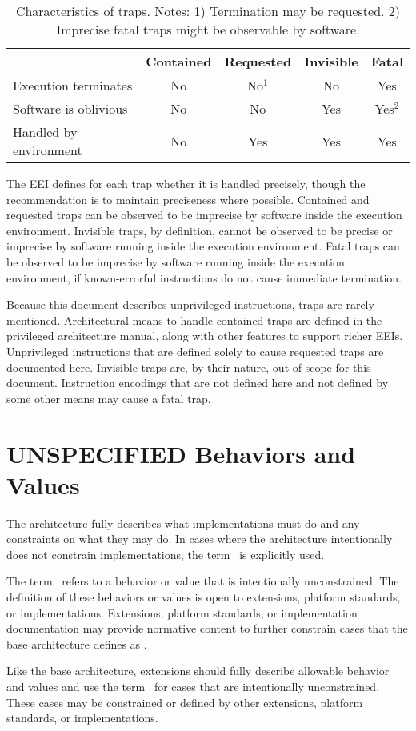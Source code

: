 \begin{table}[hbt]
  \centering
  \begin{tabular}{|l|c|c|c|c|}
      \hline
      & Contained & Requested & Invisible & Fatal\\
      \hline
      Execution terminates   & No & No$^{1}$ & No  & Yes \\
      Software is oblivious  & No & No       & Yes & Yes$^{2}$ \\
      Handled by environment & No & Yes      & Yes & Yes \\
      \hline
  \end{tabular}
  \caption{Characteristics of traps. Notes: 1) Termination may be
    requested. 2) Imprecise fatal traps might be observable by software.}
\label{table:trapcharacteristics}
\end{table}

The EEI defines for each trap whether it is handled precisely, though
the recommendation is to maintain preciseness where possible.
Contained and requested traps can be observed to be imprecise by
software inside the execution environment.  Invisible traps, by
definition, cannot be observed to be precise or imprecise by software
running inside the execution environment.  Fatal traps can be observed
to be imprecise by software running inside the execution environment,
if known-errorful instructions do not cause immediate termination.

Because this document describes unprivileged instructions, traps are
rarely mentioned.  Architectural means to handle contained traps are
defined in the privileged architecture manual, along with other
features to support richer EEIs.  Unprivileged instructions that are
defined solely to cause requested traps are documented here.
Invisible traps are, by their nature, out of scope for this document.
Instruction encodings that are not defined here and not defined by
some other means may cause a fatal trap.

\section{UNSPECIFIED Behaviors and Values}

The architecture fully describes what implementations must do and any
constraints on what they may do.  In cases where the architecture
intentionally does not constrain implementations, the term \unspecified\
is explicitly used.

The term \unspecified\ refers to a behavior or value that is
intentionally unconstrained.  The definition of these behaviors or
values is open to extensions, platform standards, or implementations.
Extensions, platform standards, or implementation documentation may
provide normative content to further constrain cases that the base
architecture defines as \unspecified.

Like the base architecture, extensions should fully describe allowable
behavior and values and use the term \unspecified\ for cases that are
intentionally unconstrained.  These cases may be constrained or defined
by other extensions, platform standards, or implementations.
